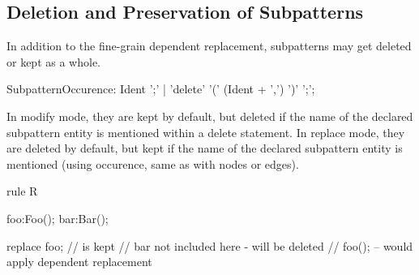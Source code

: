 \subsection{Deletion and Preservation of Subpatterns}\label{sub:delpressub}

In addition to the fine-grain dependent replacement, subpatterns may get deleted or kept as a whole.

\begin{rail}  
  SubpatternOccurence: 
    Ident ';' |
    'delete' '(' (Ident + ',') ')' ';';
\end{rail}

In modify mode, they are kept by default, but deleted if the name of the declared subpattern entity is mentioned within a delete statement.
In replace mode, they are deleted by default, but kept if the name of the declared subpattern entity is mentioned (using occurence, same as with nodes or edges).

\begin{example}
  \begin{grgen}
rule R {
  foo:Foo();
  bar:Bar();

  replace {
    foo; // is kept
    // bar not included here - will be deleted
    // foo(); -- would apply dependent replacement
  }
}
  \end{grgen}
\end{example}

